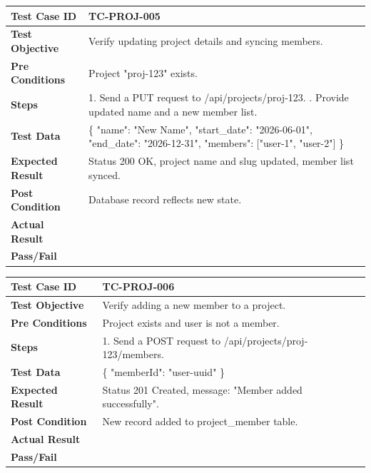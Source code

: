 \begin{longtable}{|p{}|p{}|}
\hline
\textbf{Test Case ID} & TC-PROJ-005 \\ \hline
\textbf{Test Objective} & Verify updating project details and syncing members. \\ \hline
\textbf{Pre Conditions} & Project "proj-123" exists. \\ \hline
\textbf{Steps} & 
1. Send a PUT request to /api/projects/proj-123. \newline
2. Provide updated name and a new member list. \\ \hline
\textbf{Test Data} & \{ "name": "New Name", "start\_date": "2026-06-01", "end\_date": "2026-12-31", "members": ["user-1", "user-2"] \} \\ \hline
\textbf{Expected Result} & Status 200 OK, project name and slug updated, member list synced. \\ \hline
\textbf{Post Condition} & Database record reflects new state. \\ \hline
\textbf{Actual Result} &  \\ \hline
\textbf{Pass/Fail} &  \\ \hline
\end{longtable}

\begin{longtable}{|p{}|p{}|}
\hline
\textbf{Test Case ID} & TC-PROJ-006 \\ \hline
\textbf{Test Objective} & Verify adding a new member to a project. \\ \hline
\textbf{Pre Conditions} & Project exists and user is not a member. \\ \hline
\textbf{Steps} & 
1. Send a POST request to /api/projects/proj-123/members. \\ \hline
\textbf{Test Data} & \{ "memberId": "user-uuid" \} \\ \hline
\textbf{Expected Result} & Status 201 Created, message: "Member added successfully". \\ \hline
\textbf{Post Condition} & New record added to project\_member table. \\ \hline
\textbf{Actual Result} &  \\ \hline
\textbf{Pass/Fail} &  \\ \hline
\end{longtable}

